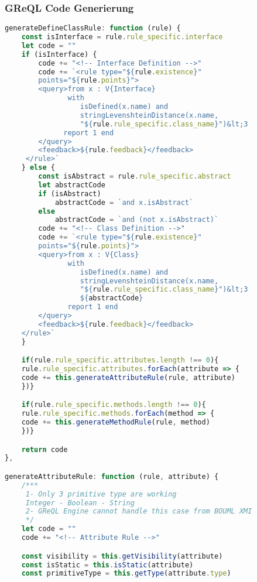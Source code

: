\subsubsection{GReQL Code Generierung}
\begin{lstlisting}[caption={Fall der Class Definition Rule}, label={lst:class_def_rule}, language=javascript]
generateDefineClassRule: function (rule) {
    const isInterface = rule.rule_specific.interface
    let code = ""
    if (isInterface) {
        code += "<!-- Interface Definition -->"
        code += `<rule type="${rule.existence}"
        points="${rule.points}">
        <query>from x : V{Interface}
               with
                  isDefined(x.name) and
                  stringLevenshteinDistance(x.name,
                  "${rule.rule_specific.class_name}")&lt;3
              report 1 end
        </query>
        <feedback>${rule.feedback}</feedback>
     </rule>`
    } else {
        const isAbstract = rule.rule_specific.abstract
        let abstractCode
        if (isAbstract)
            abstractCode = `and x.isAbstract`
        else
            abstractCode = `and (not x.isAbstract)`
        code += "<!-- Class Definition -->"
        code += `<rule type="${rule.existence}"
        points="${rule.points}">
        <query>from x : V{Class}
               with
                  isDefined(x.name) and
                  stringLevenshteinDistance(x.name,
                  "${rule.rule_specific.class_name}")&lt;3
                  ${abstractCode}
               report 1 end
        </query>
        <feedback>${rule.feedback}</feedback>
    </rule>`
    }

    if(rule.rule_specific.attributes.length !== 0){
    rule.rule_specific.attributes.forEach(attribute => {
    code += this.generateAttributeRule(rule, attribute)
    })}

    if(rule.rule_specific.methods.length !== 0){
    rule.rule_specific.methods.forEach(method => {
    code += this.generateMethodRule(rule, method)
    })}

    return code
},

generateAttributeRule: function (rule, attribute) {
    /***
     1- Only 3 primitive type are working
     Integer - Boolean - String
     2- GReQL Engine cannot handle this case from BOUML XMI
     */
    let code = ""
    code += "<!-- Attribute Rule -->"

    const visibility = this.getVisibility(attribute)
    const isStatic = this.isStatic(attribute)
    const primitiveType = this.getType(attribute.type)


\end{lstlisting}
